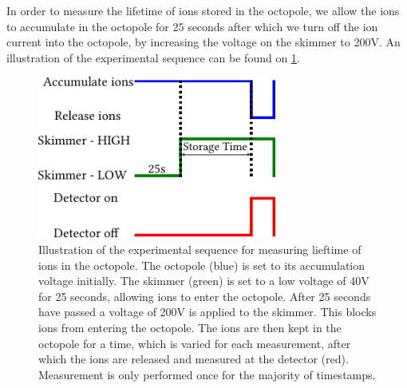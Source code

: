 In order to measure the lifetime of ions stored in the octopole, we allow the ions to accumulate in the octopole for 25 seconds after which we turn off the ion current into the octopole, by increasing the voltage on the skimmer to 200V.
An illustration of the experimental sequence can be found on \cref{fig:decaySequence}.
\begin{figure}[h]
    \centering
    \includegraphics[width = 0.7\textwidth]{main/decayPulse.pdf}
    \caption{Illustration of the experimental sequence for measuring lieftime of ions in the octopole. The octopole (blue) is set to its accumulation voltage initially. The skimmer (green) is set to a low voltage of 40V for 25 seconds, allowing ions to enter the octopole. After 25 seconds have passed a voltage of 200V is applied to the skimmer. This blocks ions from entering the octopole.
    The ions are then kept in the octopole for a time, which is varied for each measurement, after which the ions are released and measured at the detector (red). Measurement is only performed once for the majority of timestamps.}    
    \label{fig:decaySequence}
\end{figure}
